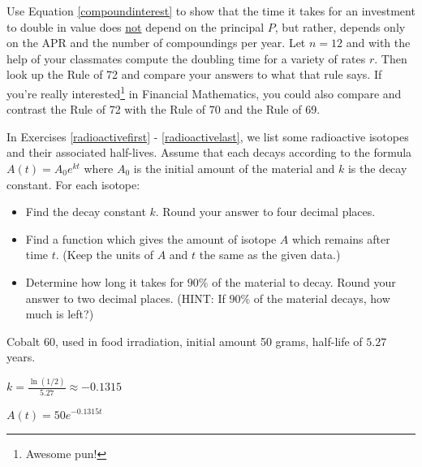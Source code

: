\documentclass{ximera}
\begin{document}
\begin{problem}
     Use Equation \ref{compoundinterest} to show that the time it takes for an investment to double in value does \underline{not} depend on the principal $P$, but rather, depends only on the APR and the number of compoundings per year.  Let $n = 12$ and with the help of your classmates compute the doubling time for a variety of rates $r$.  Then look up the Rule of 72 and compare your answers to what that rule says.  If you're really interested\footnote{Awesome pun!} in Financial Mathematics, you could also compare and contrast the Rule of 72 with the Rule of 70 and the Rule of 69.

     
\end{problem}

\begin{question}
    In Exercises \ref{radioactivefirst} - \ref{radioactivelast},  we list some radioactive isotopes and their associated half-lives.  Assume that each decays according to the formula $A(t) = A_{0}e^{kt}$ where $A_{0}$ is the initial amount of the material and $k$ is the decay constant. For each isotope:

\begin{itemize}

\item   Find the decay constant $k$.  Round your answer to four decimal places.

\item   Find a function which gives the amount of isotope $A$ which remains after time $t$.  (Keep the units of $A$ and $t$ the same as the given data.)

\item      Determine how long it takes for $90 \%$ of the material to decay.  Round your answer to two decimal places.  (HINT:  If $90 \%$ of the material decays, how much is left?)


\end{itemize} 

\begin{problem}\label{radioactivefirst}
    Cobalt 60, used in food irradiation, initial amount 50 grams, half-life of $5.27$ years.  

\begin{solution}
    $k = \frac{\ln(1/2)}{5.27} \approx -0.1315$
\end{solution}

\begin{solution}
     $A(t) = 50e^{-0.1315t}$
\end{solution}


\end{problem}
\end{question}
\end{document}
